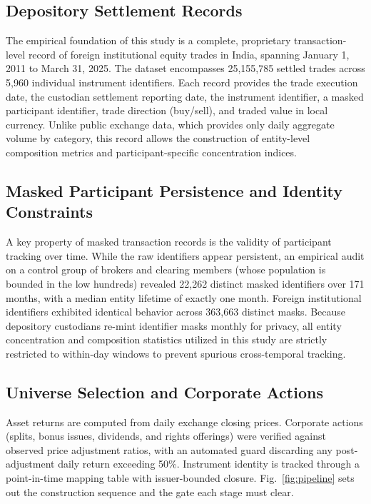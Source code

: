 \documentclass{ieeeaccess}
\begin{document}
\subsection{Depository Settlement Records}
The empirical foundation of this study is a complete, proprietary transaction-level record of foreign institutional equity trades in India, spanning January 1, 2011 to March 31, 2025. The dataset encompasses 25,155,785 settled trades across 5,960 individual instrument identifiers. Each record provides the trade execution date, the custodian settlement reporting date, the instrument identifier, a masked participant identifier, trade direction (buy/sell), and traded value in local currency. Unlike public exchange data, which provides only daily aggregate volume by category, this record allows the construction of entity-level composition metrics and participant-specific concentration indices.

\subsection{Masked Participant Persistence and Identity Constraints}
A key property of masked transaction records is the validity of participant tracking over time. While the raw identifiers appear persistent, an empirical audit on a control group of brokers and clearing members (whose population is bounded in the low hundreds) revealed 22,262 distinct masked identifiers over 171 months, with a median entity lifetime of exactly one month. Foreign institutional identifiers exhibited identical behavior across 363,663 distinct masks. Because depository custodians re-mint identifier masks monthly for privacy, all entity concentration and composition statistics utilized in this study are strictly restricted to within-day windows to prevent spurious cross-temporal tracking.

\subsection{Universe Selection and Corporate Actions}
Asset returns are computed from daily exchange closing prices. Corporate actions (splits, bonus issues, dividends, and rights offerings) were verified against observed price adjustment ratios, with an automated guard discarding any post-adjustment daily return exceeding 50\%. Instrument identity is tracked through a point-in-time mapping table with issuer-bounded closure. Fig.~\ref{fig:pipeline} sets out the construction sequence and the gate each stage must clear.
\end{document}
